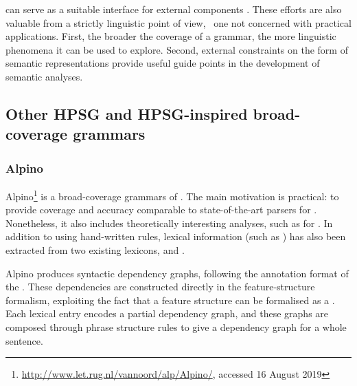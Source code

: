 \documentclass[output=paper,nonflat]{langsci/langscibook}
\begin{document}
can serve as a suitable interface for external
components \citep[e.g.,][]{flickinger2005sem}. 
These efforts are also valuable from a strictly linguistic point of view, \ie\ one not concerned with practical applications.
First, the broader the coverage of a grammar,
the more linguistic phenomena it can be used to explore.
Second, external constraints on the form of semantic representations provide
useful guide points in the development of semantic analyses.%
%


\subsection{Other HPSG and HPSG-inspired broad-coverage grammars}
\label{cl:othergrammars}

\subsubsection{Alpino}
\label{cl:other:alpino}


Alpino\footnote{%
	\url{http://www.let.rug.nl/vannoord/alp/Alpino/}, accessed 16 August 2019
}
is a broad-coverage grammars of 
\citep{BvNM2001a-u,vannoord2005alpino,vannoord2006alpino}.
The main motivation is practical: to provide coverage and accuracy
comparable to state-of-the-art parsers for .
Nonetheless, it also includes theoretically interesting analyses,
such as for  \citep{BvN98a}.
In addition to using hand-written rules,
lexical information (such as ) has also been extracted from two existing lexicons,
 \citep{baayen1995celex}
and  \citep{kruyt1997parole}.

Alpino produces syntactic dependency graphs,
following the annotation format of the  \citep{oostdijk2000corpus}.
These dependencies are constructed directly in the feature-structure formalism,
exploiting the fact that a feature structure can be formalised as a .
Each lexical entry encodes a partial dependency graph,
and these graphs are composed through phrase structure rules
to give a dependency graph for a whole sentence.
\end{document}
